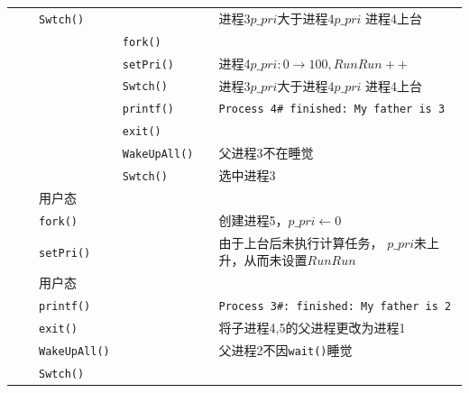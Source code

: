\begin{landscape}
\begin{longtable}{llllll}
                 &                      & \texttt{Swtch()}    &           &             & \makecell[l]{进程3$p\_pri$大于进程4$p\_pri$\\进程4上台}\\
                 &                      &     & \texttt{fork()}    &                        &\\
                 &                      &     & \texttt{setPri()}    &                        &进程4$p\_pri:0\rightarrow 100,RunRun++$ \\
                 &                      &     &\texttt{Swtch()}    &              &\makecell[l]{进程3$p\_pri$大于进程4$p\_pri$\\进程4上台}\\
                  &                      &     & \texttt{printf()}          &             & \texttt{Process 4\# finished: My father is 3}\\
                 &                      &     & \texttt{exit()}          &             & \\
                 &                      &     & \texttt{WakeUpAll()}          &             & 父进程3不在睡觉\\
                 &                      &     & \texttt{Swtch()}          &             &选中进程3\\
                 &                      &用户态              &           &             & \\
                 &                      & \texttt{fork()}    &           &             &创建进程5，$p\_pri\gets0$                  \\
                 &                      & \texttt{setPri()}    &           &             &\makecell[l]{由于上台后未执行计算任务，\\$p\_pri$未上升，从而未设置$RunRun$} \\
                 &                      &用户态               &           &             & \\
                 &                      &\texttt{printf()}   &           &             &\texttt{Process 3\#: finished: My father is 2} \\
                 &                      &\texttt{exit()}   &           &             &将子进程4,5的父进程更改为进程1\\
                 &                      &\texttt{WakeUpAll()}   &           &             &父进程2不因\texttt{wait()}睡觉\\
                 &                      &\texttt{Swtch()}   &           &             &\\

\end{longtable}
\end{landscape}
